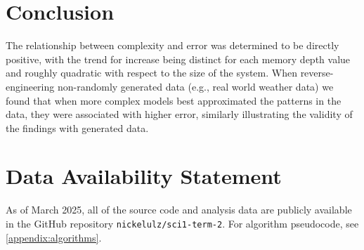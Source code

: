 \documentclass[12pt]{article}
\begin{document}
\section{Conclusion}
The relationship between complexity and error was determined to be directly positive, with the trend for increase being distinct for each memory depth value and roughly quadratic with respect to the size of the system. When reverse-engineering non-randomly generated data (e.g., real world weather data) we found that when more complex models best approximated the patterns in the data, they were associated with higher error, similarly illustrating the validity of the findings with generated data.

\section*{Data Availability Statement}

As of March 2025, all of the source code and analysis data are publicly available in the GitHub repository \texttt{nickelulz/sci1-term-2}\cite{source-repository}. For algorithm pseudocode, see \ref{appendix:algorithms}.

\printbibliography

\appendix

\newpage
{
\onehalfspacing

}
\end{document}

